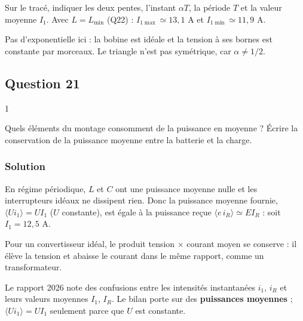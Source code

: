 \documentclass[11pt,a4paper]{article}
\newcommand{\equationajustee}[1]{%
  \sbox{\boiteequation}{$\displaystyle #1$}%
  \ifdim\wd\boiteequation>\linewidth
    \[\resizebox{\linewidth}{!}{\usebox{\boiteequation}}\]%
  \else
    \[#1\]%
  \fi}
\begin{document}
Sur le tracé, indiquer les deux pentes, l'instant \(\alpha T\), la période \(T\) et la valeur moyenne \(I_1\). Avec \(L=L_{\min}\) (Q22) : \(I_{1\max}\simeq13{,}1\) A et \(I_{1\min}\simeq11{,}9\) A.

\begin{piege}

Pas d'exponentielle ici : la bobine est idéale et la tension à ses bornes est constante par morceaux. Le triangle n'est pas symétrique, car \(\alpha\neq1/2\).

\end{piege}

\hypertarget{question-21}{%
\subsection{Question 21}\label{question-21}}

\begin{indication}{1}

Quels éléments du montage consomment de la puissance en moyenne ? Écrire la conservation de la puissance moyenne entre la batterie et la charge.

\end{indication}

\hypertarget{solution-20}{%
\subsubsection{Solution}\label{solution-20}}

En régime périodique, \(L\) et \(C\) ont une puissance moyenne nulle et les interrupteurs idéaux ne dissipent rien. Donc la puissance moyenne fournie, \(\langle Ui_1\rangle=UI_1\) (\(U\) constante), est égale à la puissance reçue \(\langle e\,i_R\rangle\simeq EI_R\) :
\equationajustee{\boxed{I_1=\frac EU\,I_R=\frac{I_R}{1-\alpha}}}
soit \(I_1=12{,}5\) A.

\begin{methode}

Pour un convertisseur idéal, le produit tension × courant moyen se conserve : il élève la tension et abaisse le courant dans le même rapport, comme un transformateur.

\end{methode}

\begin{piege}

Le rapport 2026 note des confusions entre les intensités instantanées \(i_1\), \(i_R\) et leurs valeurs moyennes \(I_1\), \(I_R\). Le bilan porte sur des \textbf{puissances moyennes} ; \(\langle Ui_1\rangle=UI_1\) seulement parce que \(U\) est constante.

\end{piege}
\end{document}
